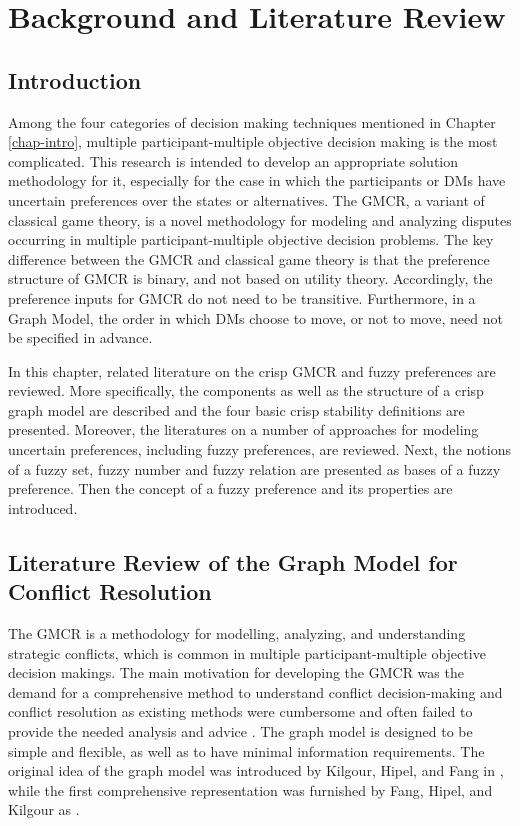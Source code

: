 \chapter{Background and Literature Review}\label{chap-back-lit}

\section{Introduction}

Among the four categories of decision making techniques mentioned in Chapter \ref{chap-intro}, multiple participant-multiple objective decision making is the most complicated. This research is intended to develop an appropriate solution methodology for it, especially for the case in which the participants or DMs have uncertain preferences over the states or alternatives. The GMCR, a variant of classical game theory, is a novel methodology for modeling and analyzing disputes occurring in multiple participant-multiple objective decision problems. The key difference between the GMCR and classical game theory is that the preference structure of GMCR is binary, and not based on utility theory. Accordingly, the preference inputs for GMCR do not need to be transitive. Furthermore, in a Graph Model, the order in which DMs choose to move, or not to move, need not be specified in advance.

In this chapter, related literature on the crisp GMCR and fuzzy preferences are reviewed. More specifically, the components as well as the structure of a crisp graph model are described and the four basic crisp stability definitions are presented. Moreover, the literatures on a number of approaches for modeling uncertain preferences, including fuzzy preferences, are reviewed. Next, the notions of a fuzzy set, fuzzy number and fuzzy relation are presented as bases of a fuzzy preference. Then the concept of a fuzzy preference and its properties are introduced.


\section{Literature Review of the Graph Model for \\Conflict Resolution}

The GMCR is a methodology for modelling, analyzing, and understanding strategic conflicts, which is common in multiple participant-multiple objective decision makings. The main motivation for developing the GMCR was the demand for a comprehensive method to understand conflict decision-making and conflict resolution as existing methods were cumbersome and often failed to provide the needed analysis and advice \citep{Kilgour&Hipel2005}. The graph model is designed to be simple and flexible, as well as to have minimal information requirements. The original idea of the graph model was introduced by Kilgour, Hipel, and Fang in \citep{Kilgour-et-al1987}, while the first comprehensive representation was furnished by Fang, Hipel, and Kilgour as \citep{Fang-et-al1993}.


